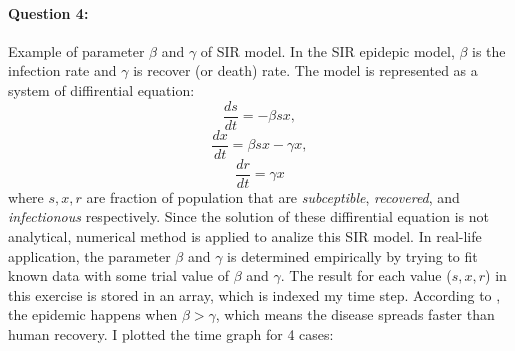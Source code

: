 \documentclass[a4paper,12pt]{article}
\begin{document}
\paragraph{Question 4:} Example of parameter $\beta$ and $\gamma$ of SIR model.
\noindent
In the SIR epidepic model, $\beta$ is the infection rate and $\gamma$ is recover (or death) rate. The model is represented as a system of diffirential equation:
$$ \frac{ds}{dt} = -\beta s x, $$
$$ \frac{dx}{dt} = \beta s x - \gamma x, $$
$$ \frac{dr}{dt} = \gamma x $$
where $s, x, r$ are fraction of population that are \emph{subceptible}, \emph{recovered}, and \emph{infectionous} respectively. Since the solution of these diffirential equation is not analytical, numerical method is applied to analize this SIR model. In real-life application, the parameter $\beta$ and $\gamma$ is determined empirically by trying to fit known data with some trial value of $\beta$ and $\gamma$. The result for each value ($s, x, r$) in this exercise is stored in an array, which is indexed my time step. According to \cite{net}, the epidemic happens when $\beta > \gamma$, which means the disease spreads faster than human recovery. I plotted the time graph for 4 cases:
\end{document}
